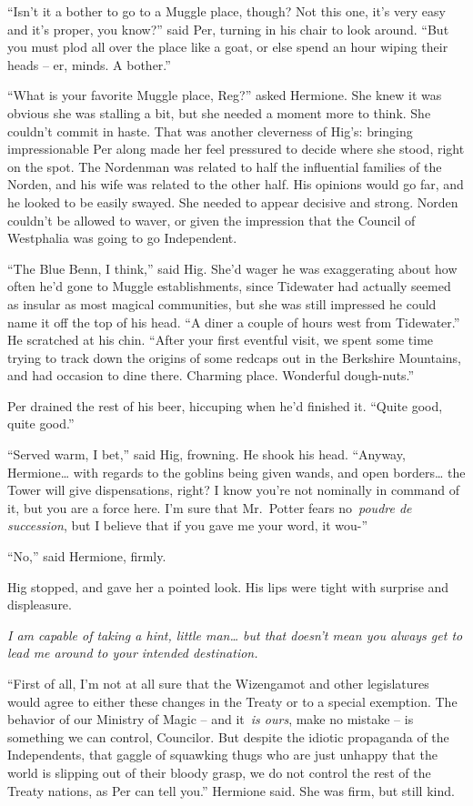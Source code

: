 ``Isn't it a bother to go to a Muggle place, though? Not this one, it's
very easy and it's proper, you know?'' said Per, turning in his chair to
look around. ``But you must plod all over the place like a goat, or else
spend an hour wiping their heads -- er, minds. A bother.''

``What is your favorite Muggle place, Reg?'' asked Hermione. She knew it
was obvious she was stalling a bit, but she needed a moment more to
think. She couldn't commit in haste. That was another cleverness of
Hig's: bringing impressionable Per along made her feel pressured to
decide where she stood, right on the spot. The Nordenman was related to
half the influential families of the Norden, and his wife was related to
the other half. His opinions would go far, and he looked to be easily
swayed. She needed to appear decisive and strong. Norden couldn't be
allowed to waver, or given the impression that the Council of Westphalia
was going to go Independent.

``The Blue Benn, I think,'' said Hig. She'd wager he was exaggerating
about how often he'd gone to Muggle establishments, since Tidewater had
actually seemed as insular as most magical communities, but she was
still impressed he could name it off the top of his head. ``A diner a
couple of hours west from Tidewater.'' He scratched at his chin. ``After
your first eventful visit, we spent some time trying to track down the
origins of some redcaps out in the Berkshire Mountains, and had occasion
to dine there. Charming place. Wonderful dough-nuts.''

Per drained the rest of his beer, hiccuping when he'd finished it.
``Quite good, quite good.''

``Served warm, I bet,'' said Hig, frowning. He shook his head. ``Anyway,
Hermione\ldots{} with regards to the goblins being given wands, and open
borders\ldots{} the Tower will give dispensations, right? I know you're
not nominally in command of it, but you are a force here. I'm sure that
Mr.~Potter fears no~\emph{poudre de succession}, but I believe that if
you gave me your word, it wou-''

``No,'' said Hermione, firmly.

Hig stopped, and gave her a pointed look. His lips were tight with
surprise and displeasure.

\emph{I am capable of taking a hint, little man\ldots{} but that doesn't
mean you always get to lead me around to your intended destination.}

``First of all, I'm not at all sure that the Wizengamot and other
legislatures would agree to either these changes in the Treaty or to a
special exemption. The behavior of our Ministry of Magic -- and
it~\emph{is ours}, make no mistake -- is something we can control,
Councilor. But despite the idiotic propaganda of the Independents, that
gaggle of squawking thugs who are just unhappy that the world is
slipping out of their bloody grasp, we do not control the rest of the
Treaty nations, as Per can tell you.'' Hermione said. She was firm, but
still kind.

